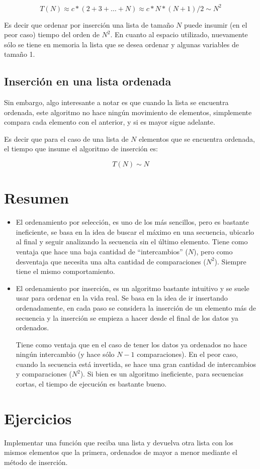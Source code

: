 \begin{equation}
T(N) \approx c * (2 + 3 + \ldots + N) \approx c * N * (N+1)/2 \sim N^2
\end{equation}

Es decir que ordenar por inserción una lista de tamaño $N$ puede insumir
(en el peor caso) tiempo del orden de $N^2$. En cuanto al espacio
utilizado, nuevamente sólo se tiene en memoria la lista que se desea
ordenar y algunas variables de tamaño 1.

\subsection{Inserción en una lista ordenada}

Sin embargo, algo interesante a notar es que cuando la lista se encuentra
ordenada, este algoritmo no hace ningún movimiento de elementos,
simplemente compara cada elemento con el anterior, y si es mayor sigue
adelante.

Es decir que para el caso de una lista de $N$ elementos que se encuentra
ordenada, el tiempo que insume el algoritmo de inserción es:

\begin{equation}
T(N) \sim N
\end{equation}


\section{Resumen}

\begin{itemize}

\item El ordenamiento por selección, es uno de los más sencillos, pero es
bastante ineficiente, se basa en la idea de buscar el máximo en una secuencia,
ubicarlo al final y seguir analizando la secuencia sin el último elemento.
Tiene como ventaja que hace una baja cantidad de ``intercambios'' ($N$), pero
como desventaja que necesita una alta cantidad de comparaciones ($N^2$).
Siempre tiene el mismo comportamiento.

\item El ordenamiento por inserción, es un algoritmo bastante intuitivo y se
suele usar para ordenar en la vida real. Se basa en la idea de ir insertando
ordenadamente, en cada paso se considera la inserción de un elemento más de
secuencia y la inserción se empieza a hacer desde el final de los datos ya
ordenados.

Tiene como ventaja que en el caso de tener los datos ya ordenados no hace
ningún intercambio (y hace sólo $N-1$ comparaciones). En el peor caso, cuando
la secuencia está invertida, se hace una gran cantidad de intercambios y
comparaciones ($N^2$). Si bien es un algoritmo ineficiente, para secuencias
cortas, el tiempo de ejecución es bastante bueno.

\end{itemize}

\newpage
\section{Ejercicios}

\begin{ejercicio}
Implementar una función que reciba una lista y devuelva otra lista con los
mismos elementos que la primera, ordenados de mayor a menor mediante el método
de inserción.
\end{ejercicio}
